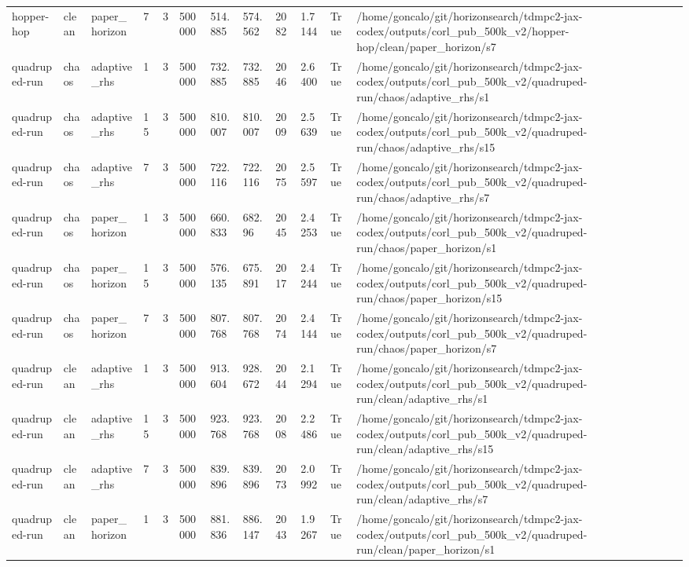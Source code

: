 \begin{tabular}{llllllllllll}
hopper-hop & clean & paper\_horizon & 7 & 3 & 500000 & 514.885 & 574.562 & 2082 & 1.7144 & True & /home/goncalo/git/horizonsearch/tdmpc2-jax-codex/outputs/corl\_pub\_500k\_v2/hopper-hop/clean/paper\_horizon/s7 \\
quadruped-run & chaos & adaptive\_rhs & 1 & 3 & 500000 & 732.885 & 732.885 & 2046 & 2.6400 & True & /home/goncalo/git/horizonsearch/tdmpc2-jax-codex/outputs/corl\_pub\_500k\_v2/quadruped-run/chaos/adaptive\_rhs/s1 \\
quadruped-run & chaos & adaptive\_rhs & 15 & 3 & 500000 & 810.007 & 810.007 & 2009 & 2.5639 & True & /home/goncalo/git/horizonsearch/tdmpc2-jax-codex/outputs/corl\_pub\_500k\_v2/quadruped-run/chaos/adaptive\_rhs/s15 \\
quadruped-run & chaos & adaptive\_rhs & 7 & 3 & 500000 & 722.116 & 722.116 & 2075 & 2.5597 & True & /home/goncalo/git/horizonsearch/tdmpc2-jax-codex/outputs/corl\_pub\_500k\_v2/quadruped-run/chaos/adaptive\_rhs/s7 \\
quadruped-run & chaos & paper\_horizon & 1 & 3 & 500000 & 660.833 & 682.96 & 2045 & 2.4253 & True & /home/goncalo/git/horizonsearch/tdmpc2-jax-codex/outputs/corl\_pub\_500k\_v2/quadruped-run/chaos/paper\_horizon/s1 \\
quadruped-run & chaos & paper\_horizon & 15 & 3 & 500000 & 576.135 & 675.891 & 2017 & 2.4244 & True & /home/goncalo/git/horizonsearch/tdmpc2-jax-codex/outputs/corl\_pub\_500k\_v2/quadruped-run/chaos/paper\_horizon/s15 \\
quadruped-run & chaos & paper\_horizon & 7 & 3 & 500000 & 807.768 & 807.768 & 2074 & 2.4144 & True & /home/goncalo/git/horizonsearch/tdmpc2-jax-codex/outputs/corl\_pub\_500k\_v2/quadruped-run/chaos/paper\_horizon/s7 \\
quadruped-run & clean & adaptive\_rhs & 1 & 3 & 500000 & 913.604 & 928.672 & 2044 & 2.1294 & True & /home/goncalo/git/horizonsearch/tdmpc2-jax-codex/outputs/corl\_pub\_500k\_v2/quadruped-run/clean/adaptive\_rhs/s1 \\
quadruped-run & clean & adaptive\_rhs & 15 & 3 & 500000 & 923.768 & 923.768 & 2008 & 2.2486 & True & /home/goncalo/git/horizonsearch/tdmpc2-jax-codex/outputs/corl\_pub\_500k\_v2/quadruped-run/clean/adaptive\_rhs/s15 \\
quadruped-run & clean & adaptive\_rhs & 7 & 3 & 500000 & 839.896 & 839.896 & 2073 & 2.0992 & True & /home/goncalo/git/horizonsearch/tdmpc2-jax-codex/outputs/corl\_pub\_500k\_v2/quadruped-run/clean/adaptive\_rhs/s7 \\
quadruped-run & clean & paper\_horizon & 1 & 3 & 500000 & 881.836 & 886.147 & 2043 & 1.9267 & True & /home/goncalo/git/horizonsearch/tdmpc2-jax-codex/outputs/corl\_pub\_500k\_v2/quadruped-run/clean/paper\_horizon/s1 \\

\end{tabular}
